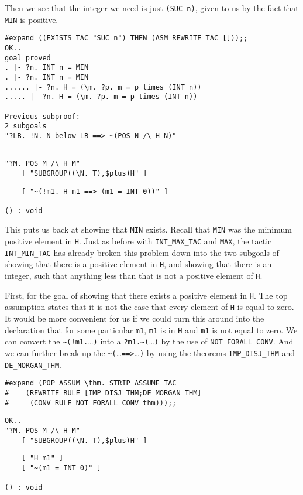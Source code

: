 Then we see that the integer we need is just {\small\verb+(SUC n)+},
given to us by the fact that {\small\verb+MIN+} is positive.
\begin{session}
\begin{verbatim}
#expand ((EXISTS_TAC "SUC n") THEN (ASM_REWRITE_TAC []));;
OK..
goal proved
. |- ?n. INT n = MIN
. |- ?n. INT n = MIN
...... |- ?n. H = (\m. ?p. m = p times (INT n))
..... |- ?n. H = (\m. ?p. m = p times (INT n))

Previous subproof:
2 subgoals
"?LB. !N. N below LB ==> ~(POS N /\ H N)"
\end{verbatim}
\mvdots
\begin{verbatim}

"?M. POS M /\ H M"
    [ "SUBGROUP((\N. T),$plus)H" ]
\end{verbatim}
\mvdots
\begin{verbatim}
    [ "~(!m1. H m1 ==> (m1 = INT 0))" ]

() : void
\end{verbatim}
\end{session}

This puts us back at showing that {\small\verb+MIN+} exists.  Recall
that {\small\verb+MIN+} was the minimum positive element in {\small\tt H}.
Just as  before with {\small\verb+INT_MAX_TAC+} and {\small\verb+MAX+},
the tactic {\small\verb+INT_MIN_TAC+} has already broken this problem
down into the two subgoals of showing that there is a positive element
in {\small\tt H}, and showing that there is an integer, such that
anything less than that is not a positive element of {\small\tt H}.

First, for the goal of showing that there exists a positive element in
{\small\tt H}.  The top assumption states that it is not the case that
every element of {\small\tt H} is equal to zero.  It would be more
convenient for us if we could turn this around into the declaration
that for some particular {\small\verb+m1+}, {\small\verb+m1+} is in
{\small\tt H} and {\small\verb+m1+} is not equal to zero.  We can
convert the {\small\verb+~(!m1.+\ldots\small\tt)} into a
{\small\verb+?m1.~(+\ldots\small\tt)} by the use of
{\small\verb+NOT_FORALL_CONV+}.  And we can further break up the
{\small\verb+~(+\ldots\small\verb+==>+\ldots\small\tt)} by using the
theorems {\small\verb+IMP_DISJ_THM+} and {\small\verb+DE_MORGAN_THM+}.
\begin{session}
\begin{verbatim}
#expand (POP_ASSUM \thm. STRIP_ASSUME_TAC 
#    (REWRITE_RULE [IMP_DISJ_THM;DE_MORGAN_THM]
#     (CONV_RULE NOT_FORALL_CONV thm)));;
\end{verbatim}
\mvdots
\begin{verbatim}
OK..
"?M. POS M /\ H M"
    [ "SUBGROUP((\N. T),$plus)H" ]
\end{verbatim}
\mvdots
\begin{verbatim}
    [ "H m1" ]
    [ "~(m1 = INT 0)" ]

() : void
\end{verbatim}
\end{session}

